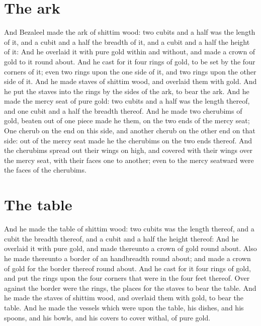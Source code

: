 \section*{The ark}
\begin{biblechapter} %
\verse And Bezaleel made the ark of shittim wood: two cubits and a half was the length of it, and a cubit and a half the breadth of it, and a cubit and a half the height of it:
\verse And he overlaid it with pure gold within and without, and made a crown of gold to it round about.
\verse And he cast for it four rings of gold, to be set by the four corners of it; even two rings upon the one side of it, and two rings upon the other side of it.
\verse And he made staves of shittim wood, and overlaid them with gold.
\verse And he put the staves into the rings by the sides of the ark, to bear the ark.
\verse And he made the mercy seat of pure gold: two cubits and a half was the length thereof, and one cubit and a half the breadth thereof.
\verse And he made two cherubims of gold, beaten out of one piece made he them, on the two ends of the mercy seat;
\verse One cherub on the end on this side, and another cherub on the other end on that side: out of the mercy seat made he the cherubims on the two ends thereof.
\verse And the cherubims spread out their wings on high, and covered with their wings over the mercy seat, with their faces one to another; even to the mercy seatward were the faces of the cherubims.
\section*{The table}
\verse And he made the table of shittim wood: two cubits was the length thereof, and a cubit the breadth thereof, and a cubit and a half the height thereof:
\verse And he overlaid it with pure gold, and made thereunto a crown of gold round about.
\verse Also he made thereunto a border of an handbreadth round about; and made a crown of gold for the border thereof round about.
\verse And he cast for it four rings of gold, and put the rings upon the four corners that were in the four feet thereof.
\verse Over against the border were the rings, the places for the staves to bear the table.
\verse And he made the staves of shittim wood, and overlaid them with gold, to bear the table.
\verse And he made the vessels which were upon the table, his dishes, and his spoons, and his bowls, and his covers to cover withal, of pure gold.

\end{biblechapter}
